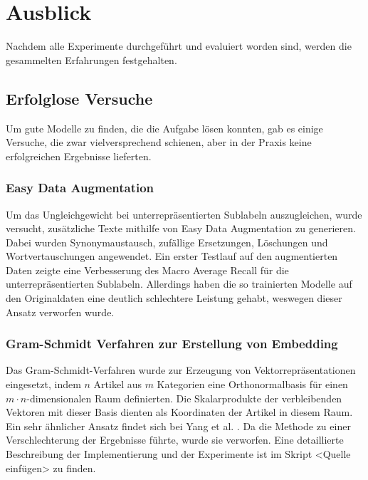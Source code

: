 \section{Ausblick}
\label{Ausblick}
Nachdem alle Experimente durchgeführt und evaluiert worden sind, werden die gesammelten Erfahrungen festgehalten.

\subsection{Erfolglose Versuche}
Um gute Modelle zu finden, die die Aufgabe lösen konnten, gab es einige Versuche, die zwar vielversprechend schienen, aber in der Praxis keine erfolgreichen Ergebnisse lieferten.

\subsubsection{Easy Data Augmentation}
\label{EDA}
Um das Ungleichgewicht bei unterrepräsentierten Sublabeln auszugleichen, wurde versucht, zusätzliche Texte mithilfe von Easy Data Augmentation \cite{Wei2019} zu generieren. Dabei wurden Synonymaustausch, zufällige Ersetzungen, Löschungen und Wortvertauschungen angewendet. Ein erster Testlauf  auf den augmentierten Daten zeigte eine Verbesserung  des Macro Average Recall für die unterrepräsentierten Sublabeln. Allerdings haben die so trainierten Modelle auf den Originaldaten eine deutlich schlechtere Leistung gehabt, weswegen dieser Ansatz verworfen wurde.

\subsubsection{Gram-Schmidt Verfahren zur Erstellung von Embedding}
\label{sec:gram}
Das Gram-Schmidt-Verfahren wurde zur Erzeugung von Vektorrepräsentationen eingesetzt, indem $n$ Artikel aus $m$ Kategorien eine Orthonormalbasis für einen $m\cdot n$-dimensionalen Raum definierten. Die Skalarprodukte der verbleibenden Vektoren mit dieser Basis dienten als Koordinaten der Artikel in diesem Raum. Ein sehr ähnlicher Ansatz findet sich bei Yang et al. \cite{Yang2019}. Da die Methode zu einer Verschlechterung der Ergebnisse führte, wurde sie verworfen. Eine detaillierte Beschreibung der Implementierung und der Experimente ist im Skript <Quelle einfügen> zu finden.

